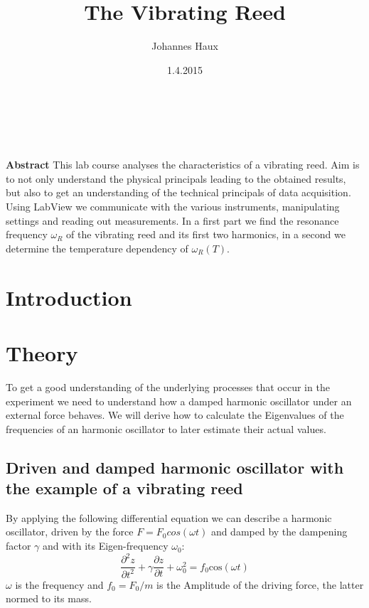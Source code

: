 \documentclass[twoside, a4paper, DIV=11,twocolumn, 12pt]{book}
\title{The Vibrating Reed}
\author{Johannes Haux}
\date{1.4.2015}
\begin{document}
\onecolumn
\maketitle
{}

\chapter*{\,}

  \noindent \textbf{Abstract} \hspace{0.3cm} 
This lab course analyses the characteristics of a vibrating reed. Aim is to not only understand the physical 
principals leading to the obtained results, but also to get an understanding of the technical principals of 
data acquisition. Using LabView we communicate with the various instruments, manipulating settings and reading out measurements. 
In a first part we find the resonance frequency $\omega_R$ of the vibrating reed and its first two harmonics, in a 
second we determine the temperature dependency of $\omega_R(T)$.

\emptypage

\tableofcontents

\emptypage

\listoffigures

\newpage

\twocolumn
\balance %
\chapter{Introduction}
\label{sec:intro}

\chapter{Theory}
\label{sec:theo}

To get a good understanding of the underlying processes that occur in the experiment we need to understand how a damped harmonic
oscillator under an external force behaves. We will derive how to calculate the Eigenvalues of the frequencies of an harmonic oscillator to later
estimate their actual values.

\section{Driven and damped harmonic oscillator with the example of a vibrating reed}
\label{sec:osz}
By applying the following differential equation we can describe a harmonic oscillator, driven by the force $F = F_0 cos(\omega t)$ and damped by the dampening factor $\gamma$ and with its Eigen-frequency $\omega_0$:
\begin{equation}
 \frac{\partial^2z}{\partial t^2} + \gamma \frac{\partial z}{\partial t} + \omega_0^2 = f_0 \mathrm{cos}(\omega t)
 \label{eq:stAmp}
\end{equation}
$\omega$ is the frequency and $f_0 = F_0/m$ is the Amplitude of the driving force, the latter normed to its mass. 
\end{document}
